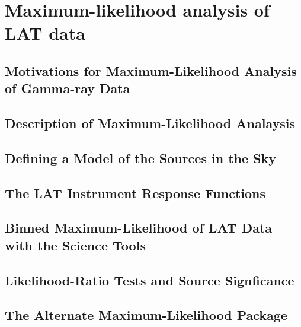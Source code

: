 \chapter{Maximum-likelihood analysis of LAT data}



\section{Motivations for Maximum-Likelihood Analysis of Gamma-ray Data}


\section{Description of Maximum-Likelihood Analaysis}


\section{Defining a Model of the Sources in the Sky}


\section{The LAT Instrument Response Functions}


\section{Binned Maximum-Likelihood of LAT Data with the Science Tools}


\section{Likelihood-Ratio Tests and Source Signficance}


\section{The Alternate Maximum-Likelihood Package \pointlike}

